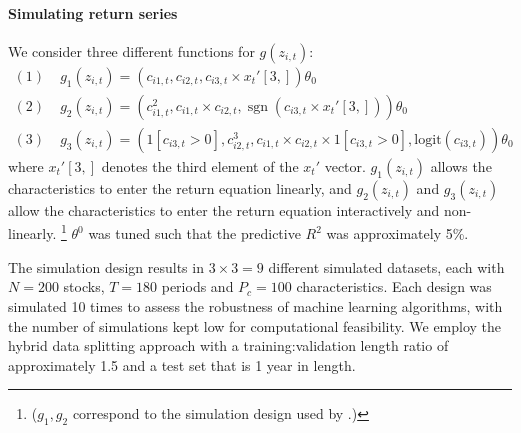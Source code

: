 \documentclass{article}
\begin{document}
\paragraph{Simulating return series}
We consider three different functions for $g(z_{i, t})$:
\begin{align}
(1)\; & g_1 \left(z_{i, t}\right)=\left(c_{i 1, t}, c_{i 2, t}, c_{i 3, t} \times x_{t}'[3,]\right) \theta_{0} \\
(2)\; & g_2 \left(z_{i, t}\right)=\left(c_{i 1, t}^{2}, c_{i 1, t} \times c_{i 2, t}, \operatorname{sgn}\left(c_{i 3, t} \times  x_{t}'[3,]\right)\right) \theta_{0} \\
(3)\; & g_3 \left(z_{i, t}\right) = \left(1[c_{i3,t}>0],c_{i 2, t}^{3}, c_{i 1, t} \times c_{i 2, t}\times 1[c_{i3,t}>0], \text{logit}\left({c}_{i3, t} \right)\right) \theta_{0}
\end{align}
where $x_{t}'[3,]$ denotes the third element of the $x_{t}'$ vector.
$g_1 \left(z_{i, t}\right)$ allows the characteristics to enter the return equation linearly, and $g_2 \left(z_{i, t}\right)$ and $g_3 \left(z_{i, t}\right)$ allow the characteristics to enter the return equation interactively and non-linearly. \footnote{($g_1, g_2$ correspond to the simulation design used by \cite{gu_empirical_2018}.)} $\theta^0$ was tuned such that the predictive $R^2$ was approximately 5\%.

The simulation design results in $3 \times 3 = 9$ different simulated datasets, each with $N = 200$ stocks, $T = 180$ periods and $P_c = 100$ characteristics. Each design was simulated 10 times to assess the robustness of machine learning algorithms, with the number of simulations kept low for computational feasibility. We employ the hybrid data splitting approach with a training:validation length ratio of approximately 1.5 and a test set that is 1 year in length. 

\end{document}
